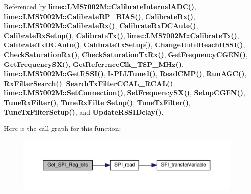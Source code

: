 Referenced by {\bf lime\+::\+L\+M\+S7002\+M\+::\+Calibrate\+Internal\+A\+D\+C()}, {\bf lime\+::\+L\+M\+S7002\+M\+::\+Calibrate\+R\+P\+\_\+\+B\+I\+A\+S()}, {\bf Calibrate\+Rx()}, {\bf lime\+::\+L\+M\+S7002\+M\+::\+Calibrate\+Rx()}, {\bf Calibrate\+Rx\+D\+C\+Auto()}, {\bf Calibrate\+Rx\+Setup()}, {\bf Calibrate\+Tx()}, {\bf lime\+::\+L\+M\+S7002\+M\+::\+Calibrate\+Tx()}, {\bf Calibrate\+Tx\+D\+C\+Auto()}, {\bf Calibrate\+Tx\+Setup()}, {\bf Change\+Until\+Reach\+R\+S\+S\+I()}, {\bf Check\+Saturation\+Rx()}, {\bf Check\+Saturation\+Tx\+Rx()}, {\bf Get\+Frequency\+C\+G\+E\+N()}, {\bf Get\+Frequency\+S\+X()}, {\bf Get\+Reference\+Clk\+\_\+\+T\+S\+P\+\_\+\+M\+Hz()}, {\bf lime\+::\+L\+M\+S7002\+M\+::\+Get\+R\+S\+S\+I()}, {\bf Is\+P\+L\+L\+Tuned()}, {\bf Read\+C\+M\+P()}, {\bf Run\+A\+G\+C()}, {\bf Rx\+Filter\+Search()}, {\bf Search\+Tx\+Filter\+C\+C\+A\+L\+\_\+\+R\+C\+A\+L()}, {\bf lime\+::\+L\+M\+S7002\+M\+::\+Set\+Connection()}, {\bf Set\+Frequency\+S\+X()}, {\bf Setup\+C\+G\+E\+N()}, {\bf Tune\+Rx\+Filter()}, {\bf Tune\+Rx\+Filter\+Setup()}, {\bf Tune\+Tx\+Filter()}, {\bf Tune\+Tx\+Filter\+Setup()}, and {\bf Update\+R\+S\+S\+I\+Delay()}.



Here is the call graph for this function\+:
\nopagebreak
\begin{figure}[H]
\begin{center}
\leavevmode
\includegraphics[width=350pt]{da/d00/spi_8c_a6ca6565d9a3c9b39a4ad5239f27665c7_cgraph}
\end{center}
\end{figure}




